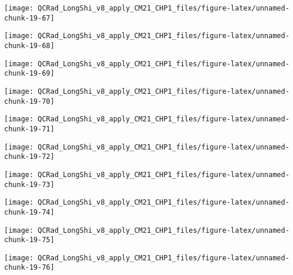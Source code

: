 \documentclass[
  10pt,
  a4paper,oneside]{article}
\begin{document}
\begin{center}\texttt{[image: QCRad\_LongShi\_v8\_apply\_CM21\_CHP1\_files/figure-latex/unnamed-chunk-19-67]} \end{center}

\begin{center}\texttt{[image: QCRad\_LongShi\_v8\_apply\_CM21\_CHP1\_files/figure-latex/unnamed-chunk-19-68]} \end{center}

\begin{center}\texttt{[image: QCRad\_LongShi\_v8\_apply\_CM21\_CHP1\_files/figure-latex/unnamed-chunk-19-69]} \end{center}

\begin{center}\texttt{[image: QCRad\_LongShi\_v8\_apply\_CM21\_CHP1\_files/figure-latex/unnamed-chunk-19-70]} \end{center}

\begin{center}\texttt{[image: QCRad\_LongShi\_v8\_apply\_CM21\_CHP1\_files/figure-latex/unnamed-chunk-19-71]} \end{center}

\begin{center}\texttt{[image: QCRad\_LongShi\_v8\_apply\_CM21\_CHP1\_files/figure-latex/unnamed-chunk-19-72]} \end{center}

\begin{center}\texttt{[image: QCRad\_LongShi\_v8\_apply\_CM21\_CHP1\_files/figure-latex/unnamed-chunk-19-73]} \end{center}

\begin{center}\texttt{[image: QCRad\_LongShi\_v8\_apply\_CM21\_CHP1\_files/figure-latex/unnamed-chunk-19-74]} \end{center}

\begin{center}\texttt{[image: QCRad\_LongShi\_v8\_apply\_CM21\_CHP1\_files/figure-latex/unnamed-chunk-19-75]} \end{center}

\begin{center}\texttt{[image: QCRad\_LongShi\_v8\_apply\_CM21\_CHP1\_files/figure-latex/unnamed-chunk-19-76]} \end{center}
\end{document}
